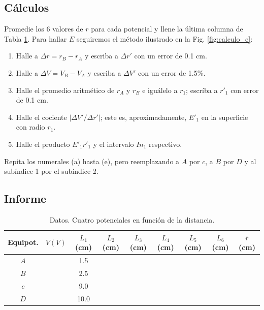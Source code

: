 \subsection{Cálculos}
Promedie los 6 valores de $r$ para cada potencial y llene la última columna de Tabla \ref{tab:gauss}. 
Para hallar $E$ seguiremos el método ilustrado en la Fig. \ref{fig:calculo_e}:
\begin{enumerate}
    \item[(a)] Halle a $\Delta r = r_B - r_A$ y escriba a $\Delta r'$ con un error de 0.1 cm.
    \item[(b)] Halle a $\Delta V = V_B - V_A$ y escriba a $\Delta V'$ con un error de 1.5\%.
    \item[(c)] Halle el promedio aritmético de $r_A$ y $r_B$ e iguálelo a $r_1$; escríba a $r'_1$ con error de 0.1 cm.
    \item[(d)] Halle el cociente $|\Delta V' / \Delta r'|$; este es, aproximadamente, $E'_1$ en la superficie con radio $r_1$.
    \item[(e)] Halle el producto $E'_1 r'_1$ y el intervalo $In_1$ respectivo.
\end{enumerate}
Repita los numerales (a) hasta (e), pero reemplazando a $A$ por $c$, a $B$ por $D$ y al subíndice 1 por el subíndice 2.

\subsection{Informe}

\begin{table}[H]
\centering
\caption{Datos. Cuatro potenciales en función de la distancia.}
\label{tab:gauss}
\begin{tabular}{|c|c|c|c|c|c|c|c||c|}
\hline
Equipot. & $V(V)$ & $L_1$ (cm) & $L_2$ (cm) & $L_3$ (cm) & $L_4$ (cm) & $L_5$ (cm) & $L_6$ (cm) & $\bar{r}$ (cm) \\ \hline
$A$ & & 1.5 & & & & & & \\ \hline
$B$ & & 2.5 & & & & & & \\ \hline
$c$ & & 9.0 & & & & & & \\ \hline
$D$ & & 10.0 & & & & & & \\ \hline
\end{tabular}
\end{table}

